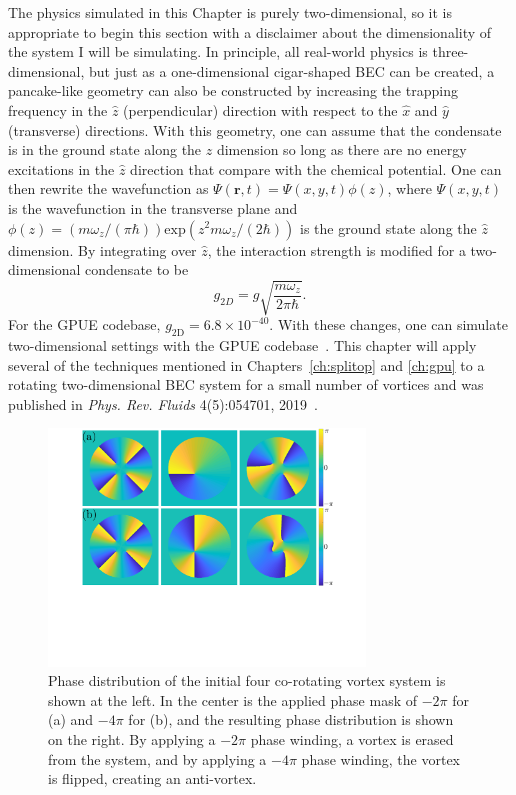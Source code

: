 The physics simulated in this Chapter is purely two-dimensional, so it is appropriate to begin this section with a disclaimer about the dimensionality of the system I will be simulating.
In principle, all real-world physics is three-dimensional, but just as a one-dimensional cigar-shaped BEC can be created, a pancake-like geometry can also be constructed by increasing the trapping frequency in the $\hat z$ (perpendicular) direction with respect to the $\hat x$ and $\hat y$ (transverse) directions.
With this geometry, one can assume that the condensate is in the ground state along the $\hat z$ dimension so long as there are no energy excitations in the $\hat z$ direction that compare with the chemical potential.
One can then rewrite the wavefunction as $\Psi(\mathbf{r},t) = \Psi(x, y, t)\phi(z)$, where $\Psi(x, y, t)$ is the wavefunction in the transverse plane and $\phi(z) = (m \omega_z/(\pi\hbar))\text{exp}(z^2 m\omega_z/(2\hbar))$ is the ground state along the $\hat z$ dimension.
By integrating over $\hat z$, the interaction strength is modified for a two-dimensional condensate to be
\begin{equation}
g_{2D} = g \sqrt{\frac{m\omega_z}{2\pi\hbar}}.
\end{equation}
\noindent For the GPUE codebase, $g_\text{2D} = 6.8\times 10^{-40}$.
With these changes, one can simulate two-dimensional settings with the GPUE codebase~\cite{zhang2019, o2017, o2016topo, o2016}.
This chapter will apply several of the techniques mentioned in Chapters~\ref{ch:splitop} and \ref{ch:gpu} to a rotating two-dimensional BEC system for a small number of vortices and was published in \textit{Phys. Rev. Fluids} 4(5):054701, 2019~\cite{zhang2019}.

\begin{figure}
\center \includegraphics[width=0.75\textwidth]{data/2d/phase/phase}

\caption{
Phase distribution of the initial four co-rotating vortex system is shown at the left.
In the center is the applied phase mask of $-2\pi$ for (a) and $-4\pi$ for (b), and the resulting phase distribution is shown on the right.
By applying a $-2\pi$ phase winding, a vortex is erased from the system, and by applying a $-4\pi$ phase winding, the vortex is flipped, creating an anti-vortex.
}
\label{fig:phase}
\end{figure}

